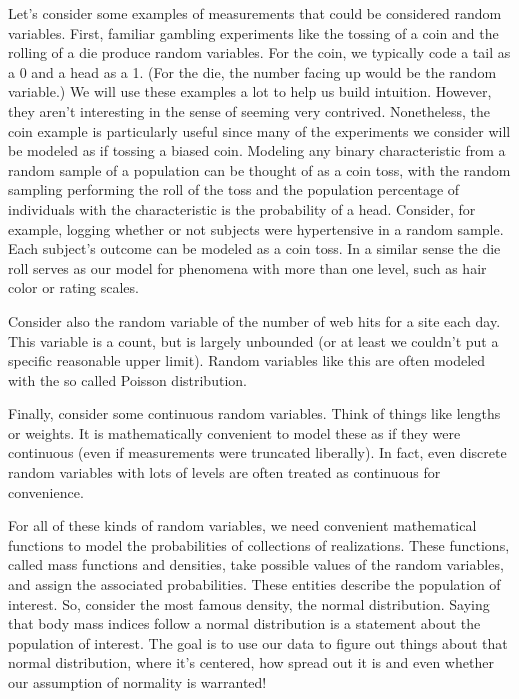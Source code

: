 \documentclass[]{article}
\begin{document}
Let's consider some examples of measurements that could be considered
random variables. First, familiar gambling experiments like the tossing
of a coin and the rolling of a die produce random variables. For the
coin, we typically code a tail as a 0 and a head as a 1. (For the die,
the number facing up would be the random variable.) We will use these
examples a lot to help us build intuition. However, they aren't
interesting in the sense of seeming very contrived. Nonetheless, the
coin example is particularly useful since many of the experiments we
consider will be modeled as if tossing a biased coin. Modeling any
binary characteristic from a random sample of a population can be
thought of as a coin toss, with the random sampling performing the roll
of the toss and the population percentage of individuals with the
characteristic is the probability of a head. Consider, for example,
logging whether or not subjects were hypertensive in a random sample.
Each subject's outcome can be modeled as a coin toss. In a similar sense
the die roll serves as our model for phenomena with more than one level,
such as hair color or rating scales.

Consider also the random variable of the number of web hits for a site
each day. This variable is a count, but is largely unbounded (or at
least we couldn't put a specific reasonable upper limit). Random
variables like this are often modeled with the so called Poisson
distribution.

Finally, consider some continuous random variables. Think of things like
lengths or weights. It is mathematically convenient to model these as if
they were continuous (even if measurements were truncated liberally). In
fact, even discrete random variables with lots of levels are often
treated as continuous for convenience.

For all of these kinds of random variables, we need convenient
mathematical functions to model the probabilities of collections of
realizations. These functions, called mass functions and densities, take
possible values of the random variables, and assign the associated
probabilities. These entities describe the population of interest. So,
consider the most famous density, the normal distribution. Saying that
body mass indices follow a normal distribution is a statement about the
population of interest. The goal is to use our data to figure out things
about that normal distribution, where it's centered, how spread out it
is and even whether our assumption of normality is warranted!
\end{document}
